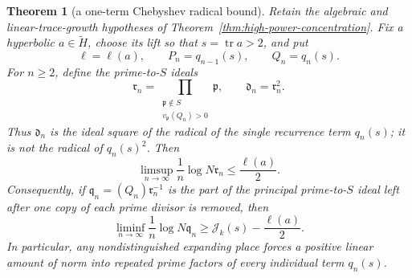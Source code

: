 \documentclass[11pt,reqno]{amsart}
\newtheorem{theorem}{Theorem}[section]
\theoremstyle{definition}
\theoremstyle{remark}
\newcommand{\Tr}{\operatorname{tr}}
\begin{document}
\begin{theorem}[a one-term Chebyshev radical bound]
\label{thm:single-term-radical-upper}
Retain the algebraic and linear-trace-growth hypotheses of
Theorem~\ref{thm:high-power-concentration}.  Fix a hyperbolic
\(a\in\widetilde H\), choose its lift so that
\(s=\Tr a>2\), and put
\[
 \ell=\ell(a),\qquad P_n=q_{n-1}(s),\qquad Q_n=q_n(s).
\]
For \(n\ge2\), define the prime-to-\(S\) ideals
\[
 \mathfrak r_n
 =\prod_{\substack{\mathfrak p\notin S\\
                    v_{\mathfrak p}(Q_n)>0}}\mathfrak p,
 \qquad
 \mathfrak d_n=\mathfrak r_n^2.
\tag{13.10bpw1}
\]
Thus \(\mathfrak d_n\) is the ideal square of the radical of the
\emph{single} recurrence term \(q_n(s)\); it is not the radical of
\(q_n(s)^2\).  Then
\[
 \limsup_{n\to\infty}\frac1n\log N\mathfrak r_n
 \le\frac{\ell(a)}2.
\tag{13.10bpw2}
\]
Consequently, if
\(\mathfrak q_n=(Q_n)\mathfrak r_n^{-1}\) is the part of the principal
prime-to-\(S\) ideal left after one copy of each prime divisor is removed,
then
\[
 \liminf_{n\to\infty}\frac1n\log N\mathfrak q_n
 \ge \mathcal J_k(s)-\frac{\ell(a)}2.
\tag{13.10bpw3}
\]
In particular, any nondistinguished expanding place forces a positive
linear amount of norm into repeated prime factors of every individual term
\(q_n(s)\).
\end{theorem}
\end{document}
